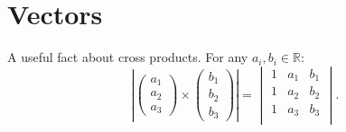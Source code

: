 \documentclass[oneside]{book}
\begin{document}
\chapter{Vectors}
\begin{note}
  A useful fact about cross products. For any \(a_i,b_i\in \mathbb{R}\):
  \[\left\lvert 
    \begin{pmatrix}
      a_1\\
      a_2\\
      a_3
    \end{pmatrix}\times
    \begin{pmatrix}
      b_1\\
      b_2\\
      b_3
    \end{pmatrix}
   \right\rvert=
  \begin{vmatrix}
    1 & a_1 & b_1\\
    1 & a_2 & b_2\\
    1 & a_3 & b_3\\
  \end{vmatrix}.\]
\end{note}
\end{document}
